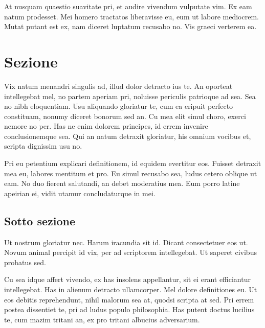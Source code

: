 \documentclass[11pt, a4paper, twoside, openright]{book}
\begin{document}
At nusquam quaestio suavitate pri, et audire vivendum vulputate vim. Ex eam
natum prodesset. Mei homero tractatos liberavisse eu, eum ut labore mediocrem.
Mutat putant est ex, nam diceret luptatum recusabo no. Vis graeci verterem ea.

\section{Sezione}
Vix natum menandri singulis ad, illud dolor detracto ius te. An oporteat
intellegebat mel, no partem aperiam pri, noluisse periculis patrioque ad sea.
Sea no nibh eloquentiam. Usu aliquando gloriatur te, cum ea eripuit perfecto
constituam, nonumy diceret bonorum sed an. Cu mea elit simul choro, exerci
nemore no per. Has ne enim dolorem principes, id errem invenire conclusionemque
sea. Qui an natum detraxit gloriatur, his omnium vocibus et, scripta dignissim
usu no.

Pri eu petentium explicari definitionem, id equidem evertitur eos. Fuisset
detraxit mea eu, labores mentitum et pro. Eu simul recusabo sea, ludus cetero
oblique ut eam. No duo fierent salutandi, an debet moderatius mea. Eum porro
latine apeirian ei, vidit utamur concludaturque in mei.

\subsection{Sotto sezione}
Ut nostrum gloriatur nec. Harum iracundia sit id. Dicant consectetuer eos ut.
Novum animal percipit id vix, per ad scriptorem intellegebat. Ut saperet civibus
probatus sed.

Cu sea idque affert vivendo, ex has insolens appellantur, sit ei erant
efficiantur intellegebat. Has in alienum detracto ullamcorper. Mel dolore
definitiones eu. Ut eos debitis reprehendunt, nihil malorum sea at, quodsi
scripta at sed. Pri errem postea dissentiet te, pri ad ludus populo philosophia.
Has putent doctus lucilius te, cum mazim tritani an, ex pro tritani albucius
adversarium.

\end{document}
